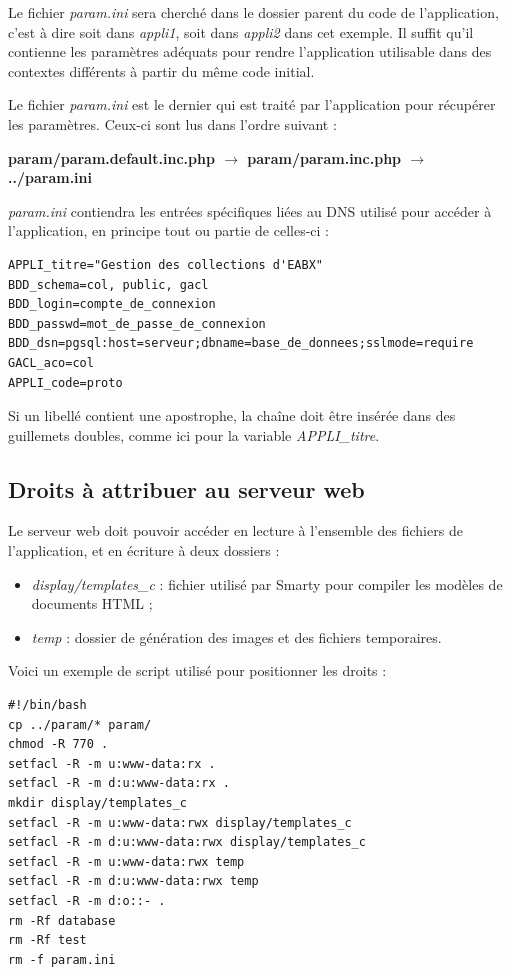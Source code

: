Le fichier \textit{param.ini} sera cherché dans le dossier parent du code de l’application, c’est à dire soit dans \textit{appli1}, soit dans \textit{appli2} dans cet exemple. Il suffit qu’il contienne les paramètres adéquats pour rendre l’application utilisable dans des contextes différents à partir du même code initial.

Le fichier \textit{param.ini} est le dernier qui est traité par l'application pour récupérer les paramètres. Ceux-ci sont lus dans l'ordre suivant :

\textbf{param/param.default.inc.php $\rightarrow$ param/param.inc.php $\rightarrow$ ../param.ini}

\textit{param.ini} contiendra les entrées spécifiques liées au DNS utilisé pour accéder à l'application, en principe tout ou partie de celles-ci :
\begin{lstlisting}
APPLI_titre="Gestion des collections d'EABX"
BDD_schema=col, public, gacl
BDD_login=compte_de_connexion
BDD_passwd=mot_de_passe_de_connexion
BDD_dsn=pgsql:host=serveur;dbname=base_de_donnees;sslmode=require
GACL_aco=col
APPLI_code=proto
\end{lstlisting}

Si un libellé contient une apostrophe, la chaîne doit être insérée dans des guillemets doubles, comme ici pour la variable \textit{APPLI\_titre}.


\subsection{Droits à attribuer au serveur web}
\label{droitsApache}
Le serveur web doit pouvoir accéder en lecture à l'ensemble des fichiers de l'application, et en écriture à deux dossiers :
\begin{itemize}
\item \textit{display/templates\_c} : fichier utilisé par Smarty pour compiler les modèles de documents HTML ;
\item \textit{temp} : dossier de génération des images et des fichiers temporaires.
\end{itemize}

Voici un exemple de script utilisé pour positionner les droits :

\begin{lstlisting}
#!/bin/bash
cp ../param/* param/
chmod -R 770 .
setfacl -R -m u:www-data:rx .
setfacl -R -m d:u:www-data:rx .
mkdir display/templates_c
setfacl -R -m u:www-data:rwx display/templates_c
setfacl -R -m d:u:www-data:rwx display/templates_c
setfacl -R -m u:www-data:rwx temp
setfacl -R -m d:u:www-data:rwx temp
setfacl -R -m d:o::- .
rm -Rf database
rm -Rf test
rm -f param.ini
\end{lstlisting}


